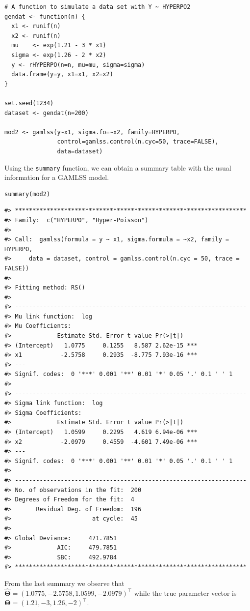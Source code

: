 \begin{verbatim}
# A function to simulate a data set with Y ~ HYPERPO2
gendat <- function(n) {
  x1 <- runif(n)
  x2 <- runif(n)
  mu    <- exp(1.21 - 3 * x1)
  sigma <- exp(1.26 - 2 * x2)
  y <- rHYPERPO(n=n, mu=mu, sigma=sigma)
  data.frame(y=y, x1=x1, x2=x2)
}

set.seed(1234)
dataset <- gendat(n=200)

mod2 <- gamlss(y~x1, sigma.fo=~x2, family=HYPERPO, 
               control=gamlss.control(n.cyc=50, trace=FALSE),
               data=dataset)
\end{verbatim}

Using the \texttt{summary} function, we can obtain a summary table with the usual information for a GAMLSS model.

\begin{verbatim}
summary(mod2)
\end{verbatim}

\begin{verbatim}
#> ******************************************************************
#> Family:  c("HYPERPO", "Hyper-Poisson") 
#> 
#> Call:  gamlss(formula = y ~ x1, sigma.formula = ~x2, family = HYPERPO,  
#>     data = dataset, control = gamlss.control(n.cyc = 50, trace = FALSE)) 
#> 
#> Fitting method: RS() 
#> 
#> ------------------------------------------------------------------
#> Mu link function:  log
#> Mu Coefficients:
#>             Estimate Std. Error t value Pr(>|t|)    
#> (Intercept)   1.0775     0.1255   8.587 2.62e-15 ***
#> x1           -2.5758     0.2935  -8.775 7.93e-16 ***
#> ---
#> Signif. codes:  0 '***' 0.001 '**' 0.01 '*' 0.05 '.' 0.1 ' ' 1
#> 
#> ------------------------------------------------------------------
#> Sigma link function:  log
#> Sigma Coefficients:
#>             Estimate Std. Error t value Pr(>|t|)    
#> (Intercept)   1.0599     0.2295   4.619 6.94e-06 ***
#> x2           -2.0979     0.4559  -4.601 7.49e-06 ***
#> ---
#> Signif. codes:  0 '***' 0.001 '**' 0.01 '*' 0.05 '.' 0.1 ' ' 1
#> 
#> ------------------------------------------------------------------
#> No. of observations in the fit:  200 
#> Degrees of Freedom for the fit:  4
#>       Residual Deg. of Freedom:  196 
#>                       at cycle:  45 
#>  
#> Global Deviance:     471.7851 
#>             AIC:     479.7851 
#>             SBC:     492.9784 
#> ******************************************************************
\end{verbatim}

From the last summary we observe that \(\hat{\boldsymbol{\Theta}}=(1.0775, -2.5758, 1.0599, -2.0979)^\top\) while the true parameter vector is \(\boldsymbol{\Theta}=(1.21, -3, 1.26, -2)^\top\).

